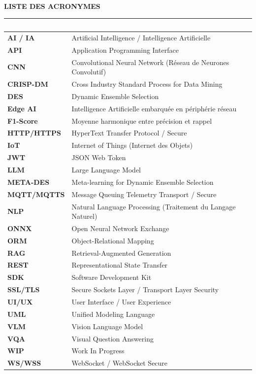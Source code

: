 \thispagestyle{preStyle}
\begin{center}
  {\fontsize{16}{20}\selectfont\bfseries LISTE DES ACRONYMES}\\[0.2cm]
\end{center}

\vspace{0.2cm}
\renewcommand{\arraystretch}{1.15}   %
\small
\begin{tabularx}{\textwidth}{@{} >{\bfseries}l X @{}}
  \toprule
  \rowcolor[HTML]{2C3E50}
  \textcolor{white}{\textbf{Acronyme}} & \textcolor{white}{\textbf{Signification}} \\
  \midrule
  AI / IA      & Artificial Intelligence / Intelligence Artificielle \\
  API          & Application Programming Interface \\
  CNN          & Convolutional Neural Network (Réseau de Neurones Convolutif) \\
  CRISP-DM     & Cross Industry Standard Process for Data Mining \\
  DES          & Dynamic Ensemble Selection \\
  Edge AI      & Intelligence Artificielle embarquée en périphérie réseau \\
  F1-Score     & Moyenne harmonique entre précision et rappel \\
  HTTP/HTTPS   & HyperText Transfer Protocol / Secure \\
  IoT          & Internet of Things (Internet des Objets) \\
  JWT          & JSON Web Token \\
  LLM          & Large Language Model \\
  META-DES     & Meta-learning for Dynamic Ensemble Selection \\
  MQTT/MQTTS   & Message Queuing Telemetry Transport / Secure \\
  NLP          & Natural Language Processing (Traitement du Langage Naturel) \\
  ONNX         & Open Neural Network Exchange \\
  ORM          & Object-Relational Mapping \\
  RAG          & Retrieval-Augmented Generation \\
  REST         & Representational State Transfer \\
  SDK          & Software Development Kit \\
  SSL/TLS      & Secure Sockets Layer / Transport Layer Security \\
  UI/UX        & User Interface / User Experience \\
  UML          & Unified Modeling Language \\
  VLM          & Vision Language Model \\
  VQA          & Visual Question Answering \\
  WIP          & Work In Progress \\
  WS/WSS       & WebSocket / WebSocket Secure \\
  \bottomrule
\end{tabularx}

